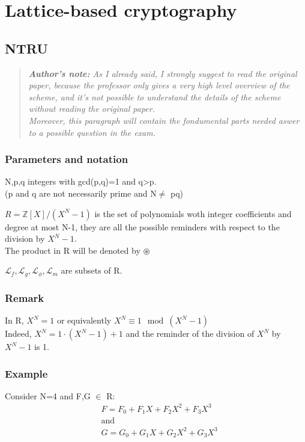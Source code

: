 \section{Lattice-based cryptography}

\subsection{NTRU}
\begin{quotation}
    \textit{\textbf{Author's note:} As I already said, I strongly suggest to read the original paper, because the professor only gives a very high level overview of the scheme, and it's not possible to understand the details of the scheme without reading the original paper.\\
    Moreover, this paragraph will contain the fondumental parts needed aswer to a possible question in the exam.}
\end{quotation}

\subsubsection{Parameters and notation}
N,p,q integers with gcd(p,q)=1 and q>p.\\
(p and q are not necessarily prime and N$\neq$ pq)
\bigskip

\noindent
$R = \mathbb{Z}[X] / (X^N - 1)$ is the set of polynomials woth integer coefficients and degree at most N-1, they are all the possible reminders with respect to the division by $X^N - 1$.\\
The product in R will be denoted by $\circledast$
\bigskip

\noindent
$\mathcal{L}_f, \mathcal{L}_g, \mathcal{L}_\phi, \mathcal{L}_m$ are subsets of R.

\subsubsection*{Remark}
In R, $X^N = 1$ or equivalently $X^N \equiv 1 \mod (X^N - 1)$\\
Indeed, $X^N = 1 \cdot (X^N - 1) + 1$ and the reminder of the division of $X^N$ by $X^N - 1$ is 1.

\subsubsection*{Example}
Consider N=4 and F,G $\in$ R:
\begin{align*}
    &F= F_0 + F_1 X + F_2 X^2 + F_3 X^3 \\
    &\text{and}\\
    &G= G_0 + G_1 X + G_2 X^2 + G_3 X^3
\end{align*}

